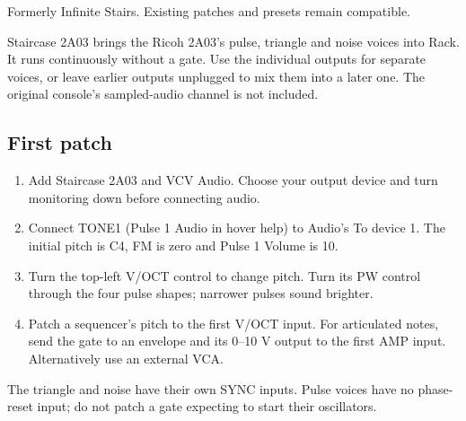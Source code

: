 Formerly Infinite Stairs. Existing patches and presets remain compatible.

Staircase 2A03 brings the Ricoh 2A03's pulse, triangle and noise voices into
Rack. It runs continuously without a gate. Use the individual outputs for
separate voices, or leave earlier outputs unplugged to mix them into a later
one. The original console's sampled-audio channel is not included.
\subsection{First patch}
\begin{enumerate}
\item Add Staircase 2A03 and VCV Audio. Choose your output device and turn
monitoring down before connecting audio.
\item Connect TONE1 (Pulse 1 Audio in hover help) to Audio's To device 1.
The initial pitch is C4, FM is zero and Pulse 1 Volume is 10.
\item Turn the top-left V/OCT control to change pitch. Turn its PW control
through the four pulse shapes; narrower pulses sound brighter.
\item Patch a sequencer's pitch to the first V/OCT input. For articulated
notes, send the gate to an envelope and its 0--10 V output to the first AMP
input. Alternatively use an external VCA.
\end{enumerate}
The triangle and noise have their own SYNC inputs. Pulse voices have no
phase-reset input; do not patch a gate expecting to start their oscillators.
